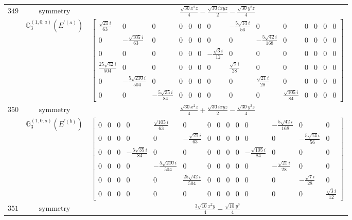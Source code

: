 \documentclass[fleqn,8pt,landscape]{jsarticle}
\begin{document}
\begin{longtable}{ccc}
$ 349 $ & $ \text{symmetry} $ & $ \frac{\sqrt{30} x^{2} z}{4} - \frac{\sqrt{30} i x y z}{2} - \frac{\sqrt{30} y^{2} z}{4} $ \\
$  $ & $ \mathbb{G}_{3}^{(1,0;a)}(E^{\prime(a)}) $ & $ \begin{bmatrix} \frac{\sqrt{21} i}{63} & 0 & 0 & 0 & 0 & 0 & 0 & - \frac{5 \sqrt{14} i}{56} & 0 & 0 & 0 & 0 & 0 & 0 \\ 0 & - \frac{\sqrt{105} i}{63} & 0 & 0 & 0 & 0 & 0 & 0 & - \frac{5 \sqrt{42} i}{168} & 0 & 0 & 0 & 0 & 0 \\ 0 & 0 & 0 & 0 & 0 & 0 & - \frac{\sqrt{3} i}{12} & 0 & 0 & 0 & 0 & 0 & 0 & 0 \\ \frac{25 \sqrt{42} i}{504} & 0 & 0 & 0 & 0 & 0 & 0 & \frac{\sqrt{7} i}{28} & 0 & 0 & 0 & 0 & 0 & 0 \\ 0 & - \frac{5 \sqrt{210} i}{504} & 0 & 0 & 0 & 0 & 0 & 0 & \frac{\sqrt{21} i}{28} & 0 & 0 & 0 & 0 & 0 \\ 0 & 0 & - \frac{5 \sqrt{35} i}{84} & 0 & 0 & 0 & 0 & 0 & 0 & \frac{\sqrt{105} i}{84} & 0 & 0 & 0 & 0 \end{bmatrix} $ \\ \hline
$ 350 $ & $ \text{symmetry} $ & $ \frac{\sqrt{30} x^{2} z}{4} + \frac{\sqrt{30} i x y z}{2} - \frac{\sqrt{30} y^{2} z}{4} $ \\
$  $ & $ \mathbb{G}_{3}^{(1,0;a)}(E^{\prime(b)}) $ & $ \begin{bmatrix} 0 & 0 & 0 & 0 & \frac{\sqrt{105} i}{63} & 0 & 0 & 0 & 0 & 0 & 0 & - \frac{5 \sqrt{42} i}{168} & 0 & 0 \\ 0 & 0 & 0 & 0 & 0 & - \frac{\sqrt{21} i}{63} & 0 & 0 & 0 & 0 & 0 & 0 & - \frac{5 \sqrt{14} i}{56} & 0 \\ 0 & 0 & 0 & - \frac{5 \sqrt{35} i}{84} & 0 & 0 & 0 & 0 & 0 & 0 & - \frac{\sqrt{105} i}{84} & 0 & 0 & 0 \\ 0 & 0 & 0 & 0 & - \frac{5 \sqrt{210} i}{504} & 0 & 0 & 0 & 0 & 0 & 0 & - \frac{\sqrt{21} i}{28} & 0 & 0 \\ 0 & 0 & 0 & 0 & 0 & \frac{25 \sqrt{42} i}{504} & 0 & 0 & 0 & 0 & 0 & 0 & - \frac{\sqrt{7} i}{28} & 0 \\ 0 & 0 & 0 & 0 & 0 & 0 & 0 & 0 & 0 & 0 & 0 & 0 & 0 & \frac{\sqrt{3} i}{12} \end{bmatrix} $ \\ \hline
$ 351 $ & $ \text{symmetry} $ & $ \frac{3 \sqrt{10} x^{2} y}{4} - \frac{\sqrt{10} y^{3}}{4} $ \\

\end{longtable}
\end{document}
